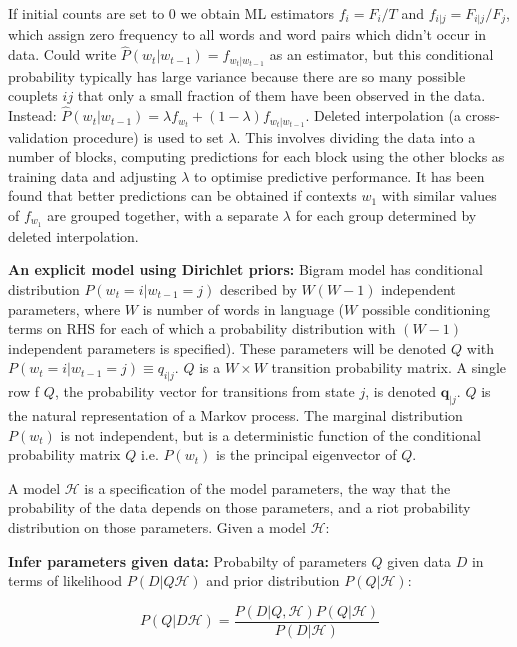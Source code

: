 If initial counts are set to 0 we obtain ML estimators $f_{i}=F_{i}/T$ and $f_{i|j}=F_{i|j}/F_{j}$, which assign zero frequency to all words and word pairs which didn't occur in data. Could write $\hat{P}(w_{t}|w_{t-1})=f_{w_{t}|w_{t-1}}$ as an estimator, but this conditional probability typically has large variance because there are so many possible couplets $ij$ that only a small fraction of them have been observed in the data. Instead: $\hat{P}(w_{t}|w_{t-1})=\lambda f_{w_{t}}+(1-\lambda)f_{w_{t}|w_{t-1}}$. Deleted interpolation (a cross-validation procedure) is used to set $\lambda$. This involves dividing the data into a number of blocks, computing predictions for each block using the other blocks as training data and adjusting $\lambda$ to optimise predictive performance. It has been found that better predictions can be obtained if contexts $w_{1}$ with similar values of $f_{w_{1}}$ are grouped together, with a separate $\lambda$ for each group determined by deleted interpolation.

\textbf{An explicit model using Dirichlet priors: } Bigram model has conditional distribution $P(w_{t}=i|w_{t-1}=j)$ described by $W(W-1)$ independent parameters, where $W$ is number of words in language ($W$ possible conditioning terms on RHS for each of which a probability distribution with $(W-1)$ independent parameters is specified). These parameters will be denoted $Q$ with $P(w_{t}=i|w_{t-1}=j)\equiv q_{i|j}$. $Q$ is a $W\times W$ transition probability matrix. A single row f $Q$, the probability vector for transitions from state $j$, is denoted $\boldsymbol{q}_{|j}$. $Q$ is the natural representation of a Markov process. The marginal distribution $P(w_{t})$ is not independent, but is a deterministic function of the conditional probability matrix $Q$ i.e. $P(w_{t})$ is the principal eigenvector of $Q$. 

A model $\mathscr{H}$ is a specification of the model parameters, the way that the probability of the data depends on those parameters, and a riot probability distribution on those parameters. Given a model $\mathscr{H}$:

\textbf{Infer parameters given data: } Probabilty of parameters $Q$ given data $D$ in terms of likelihood $P(D|Q\mathscr{H})$ and prior distribution $P(Q|\mathscr{H})$:

\begin{equation}
P(Q|D\mathscr{H})=\frac{P(D|Q, \mathscr{H})P(Q|\mathscr{H})}{P(D|\mathscr{H})}
\end{equation}

